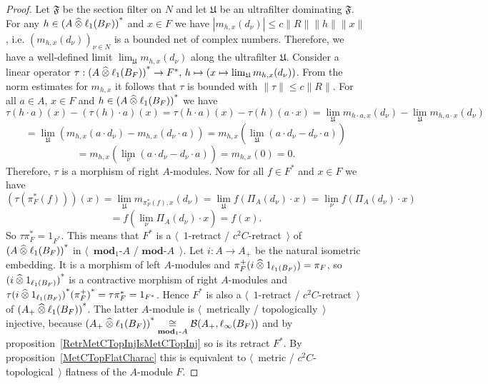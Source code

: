 \begin{proof}
Let $\mathfrak{F}$ be the section filter on $N$ and let $\mathfrak{U}$ be an
ultrafilter dominating $\mathfrak{F}$. For any 
$h\in {(A\mathbin{\widehat{\otimes}}\ell_1(B_F))}^*$ and $x\in F$ we 
have $|m_{h,x}(d_\nu)|\leq c\lVert R\rVert\lVert h\rVert\lVert x\rVert$, 
i.e. ${(m_{h,x}(d_\nu))}_{\nu\in N}$ is a
bounded net of complex numbers. Therefore, we have a well-defined limit
$\lim_{\mathfrak{U}}m_{h,x}(d_\nu)$ along the ultrafilter $\mathfrak{U}$. 
Consider a linear operator 
$\tau:
{(A\mathbin{\widehat{\otimes}}\ell_1(B_F))}^*\to F^*,\, 
h\mapsto(x\mapsto\lim_{\mathfrak{U}}m_{h,x}(d_\nu))$. From 
the norm estimates for $m_{h,x}$ it follows that $\tau$ is bounded 
with $\lVert\tau\rVert\leq c\lVert R\rVert$. For all $a\in A$, $x\in F$ 
and $h\in {(A\mathbin{\widehat{\otimes}}\ell_1(B_F))}^*$ we have
\[
\tau(h\cdot a)(x)-(\tau(h)\cdot a)(x)
=\tau(h\cdot a)(x)-\tau(h)(a\cdot x)
=\lim_{\mathfrak{U}}m_{h\cdot a,x}(d_\nu)
-\lim_{\mathfrak{U}}m_{h,a\cdot x}(d_\nu)
\]
\[
=\lim_{\mathfrak{U}}(m_{h,x}(a\cdot d_\nu)-m_{h,x}(d_\nu\cdot a))
=m_{h,x}\left(\lim_{\mathfrak{U}}(a\cdot d_\nu-d_\nu\cdot a)\right)
\]
\[
=m_{h,x}\left(\lim_{\nu}(a\cdot d_\nu-d_\nu\cdot a)\right)
=m_{h,x}(0)
=0.
\]
Therefore, $\tau$ is a morphism of right $A$-modules. Now for all $f\in F^*$ and
$x\in F$ we have
\[
(\tau(\pi_F^*(f)))(x)
=\lim_{\mathfrak{U}}m_{\pi_F^*(f),x}(d_\nu)
=\lim_{\mathfrak{U}}f(\Pi_A(d_\nu)\cdot x)
=\lim_{\nu}f(\Pi_A(d_\nu)\cdot x)
\]
\[
=f\left(\lim_{\nu}\Pi_A(d_\nu)\cdot x\right)
=f(x).
\]
So $\tau\pi_F^*=1_{F^*}$. This means that $F^*$ is a $\langle$~$1$-retract /
 $c^2 C$-retract~$\rangle$ of ${(A\mathbin{\widehat{\otimes}}\ell_1(B_F))}^*$ in
 $\langle$~$\mathbf{mod}_1\text{-}A$ / $\mathbf{mod}\text{-}A$~$\rangle$. Let $i:A\to A_+$ be
 the natural isometric embedding. It is a morphism of left $A$-modules
 and $\pi_F^+(i\mathbin{\widehat{\otimes}} 1_{\ell_1(B_F)})=\pi_F$, so
 ${(i\mathbin{\widehat{\otimes}} 1_{\ell_1(B_F)})}^*$ is a contractive morphism of right
 $A$-modules and
 $\tau{(i\mathbin{\widehat{\otimes}}1_{\ell_1(B_F)})}^*{(\pi_F^+)}^*=\tau\pi_F^*=1_{F^*}$.
 Hence $F^*$ is also a $\langle$~$1$-retract / $c^2 C$-retract~$\rangle$ of
 ${(A_+\mathbin{\widehat{\otimes}}\ell_1(B_F))}^*$. The latter
 $A$-module is $\langle$~metrically / topologically~$\rangle$ injective, because
 ${(A_+\mathbin{\widehat{\otimes}}\ell_1(B_F))}^*
 \mathrel{\mathop{\cong}\limits_{\mathbf{mod}_1\text{-}A}}
 \mathcal{B}(A_+,\ell_\infty(B_F))$
 and by proposition~\ref{RetrMetCTopInjIsMetCTopInj} so is its 
 retract $F^*$. By proposition~\ref{MetCTopFlatCharac} this is equivalent 
 to $\langle$~metric / $c^2 C$-topological~$\rangle$ flatness of the $A$-module $F$.
\end{proof}

